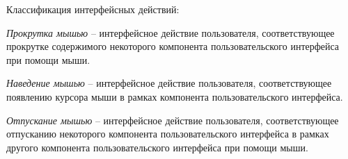 Классификация интерфейсных действий:
\begin{scnindent}
\begin{scnindent}
\end{scnindent}
\begin{scnindent}
\end{scnindent}
\end{scnindent}
\begin{scnindent}
\end{scnindent}
\begin{scnindent}
\begin{scnindent}
\end{scnindent}
\begin{scnindent}
\end{scnindent}
\end{scnindent}
\begin{scnindent}
\end{scnindent}

\bigskip
\textit{Прокрутка мышью} -- интерфейсное действие пользователя, соответствующее прокрутке содержимого некоторого компонента пользовательского интерфейса при помощи мыши.

\textit{Наведение мышью} -- интерфейсное действие пользователя, соответствующее появлению курсора мыши в рамках компонента пользовательского интерфейса.

\textit{Отпускание мышью} -- интерфейсное действие пользователя, соответствующее отпусканию некоторого компонента пользовательского интерфейса в рамках другого компонента пользовательского интерфейса при помощи мыши.

